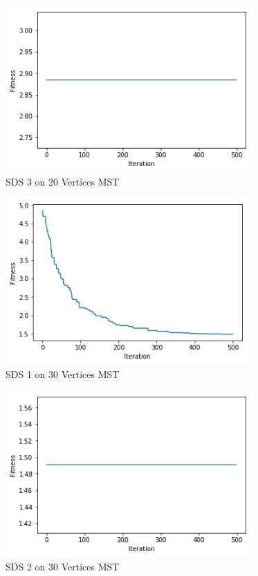 \documentclass{AISB2008}
\begin{document}
{\begin{figure}
\centerline{\includegraphics[height=2.5in]{20MSTA3.png}}
\caption{SDS 3 on 20 Vertices MST}
\end{figure}


\begin{figure}
\centerline{\includegraphics[height=2.5in]{30MSTA1.png}}
\caption{SDS 1 on 30 Vertices MST}
\end{figure}

\begin{figure}
\centerline{\includegraphics[height=2.5in]{30MSTA2.png}}
\caption{SDS 2 on 30 Vertices MST}
\end{figure}

}
\end{document}
